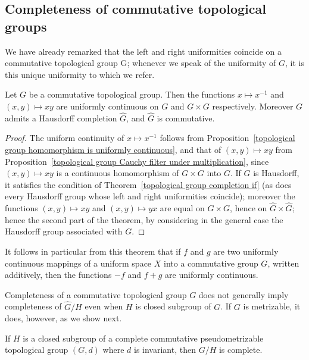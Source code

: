 \subsection{Completeness of commutative topological groups}
We have already remarked that the left and right uniformities coincide on a commutative topological group G; whenever we speak of the uniformity of $G$, it is this unique uniformity to which we refer.
\begin{theorem}\label{topological group commutative completion}
Let $G$ be a commutative topological group. Then the functions $x\mapsto x^{-1}$ and $(x,y)\mapsto xy$ are uniformly continuous on $G$ and $G\times G$ respectively. Moreover $G$ admits a Hausdorff completion $\widehat{G}$, and $\widehat{G}$ is commutative.
\end{theorem}
\begin{proof}
The uniform continuity of $x\mapsto x^{-1}$ follows from Proposition~\ref{topological group homomorphism is uniformly continuous}, and that of $(x,y)\mapsto xy$ from Proposition~\ref{topological group Cauchy filter under multiplication}, since $(x,y)\mapsto xy$ is a continuous homomorphism of $G\times G$ into $G$. If $G$ is Hausdorff, it satisfies the condition of Theorem~\ref{topological group completion if} (as does every Hausdorff group whose left and right uniformities coincide); moreover the functions $(x,y)\mapsto xy$ and $(x,y)\mapsto yx$ are equal on $G\times G$, hence on $\widehat{G}\times\widehat{G}$; hence the second part of the theorem, by considering in the general case the Hausdorff group associated with $G$.
\end{proof}
It follows in particular from this theorem that if $f$ and $g$ are two uniformly continuous mappings of a uniform space $X$ into a commutative group $G$, written additively, then the functions $-f$ and $f+g$ are uniformly continuous.\par
Completeness of a commutative topological group $G$ does not generally imply completeness of $\widehat{G}/H$ even when $H$ is closed subgroup of $G$. If $G$ is metrizable, it does, however, as we show next.
\begin{proposition}\label{topological group metric quotient is complete}
If $H$ is a closed subgroup of a complete commutative pseudometrizable topological group $(G,d)$ where $d$ is invariant, then $G/H$ is complete.
\end{proposition}
